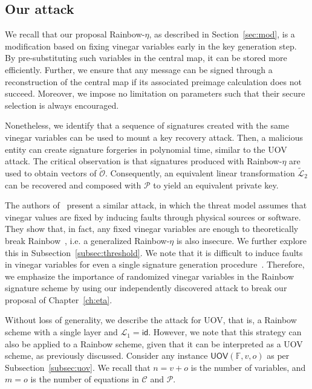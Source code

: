 \documentclass[12pt, a4paper, oneside]{memoir}
\theoremstyle{definition}
\begin{document}
\subsection{Our attack}\label{subsec:etaks}

We recall that our proposal Rainbow-$\eta$, as described in Section~\ref{sec:mod}, is a modification based on fixing vinegar variables early in the key generation step. By pre-substituting such variables in the central map, it can be stored more efficiently. Further, we ensure that any message can be signed through a reconstruction of the central map if its associated preimage calculation does not succeed. Moreover, we impose no limitation on parameters such that their secure selection is always encouraged.

Nonetheless, we identify that a sequence of signatures created with the same vinegar variables can be used to mount a key recovery attack. Then, a malicious entity can create signature forgeries in polynomial time, similar to the UOV attack. The critical observation is that signatures produced with Rainbow-$\eta$ are used to obtain vectors of $\widetilde{\mathcal{O}}$. Consequently, an equivalent linear transformation $\widetilde{\mathcal{L}}_{2}$ can be recovered and composed with $\mathcal{P}$ to yield an equivalent private key.

The authors of~\cite{Shim:202002} present a similar attack, in which the threat model assumes that vinegar values are fixed by inducing faults through physical sources or software. They show that, in fact, any fixed vinegar variables are enough to theoretically break Rainbow~\cite[Thm.~4]{Shim:202002}, i.e. a generalized Rainbow-$\eta$ is also insecure. We further explore this in Subsection~\ref{subsec:threshold}. We note that it is difficult to induce faults in vinegar variables for even a single signature generation procedure~\cite{Mus:202011}. Therefore, we emphasize the importance of randomized vinegar variables in the Rainbow signature scheme by using our independently discovered attack to break our proposal of Chapter~\ref{ch:eta}.

Without loss of generality, we describe the attack for UOV, that is, a Rainbow scheme with a single layer and $\mathcal{L}_{1} = \textsf{id}$. However, we note that this strategy can also be applied to a Rainbow scheme, given that it can be interpreted as a UOV scheme, as previously discussed. Consider any instance $\textsf{UOV}(\mathbb{F}, v, o)$ as per Subsection~\ref{subsec:uov}. We recall that $n = v + o$ is the number of variables, and $m = o$ is the number of equations in $\mathcal{C}$ and $\mathcal{P}$. 
\end{document}
